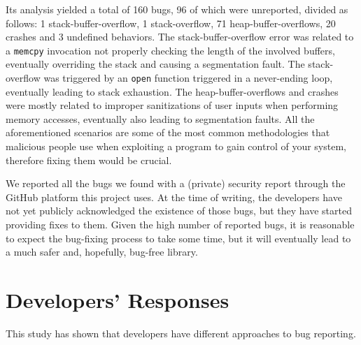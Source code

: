 Its analysis yielded a total of 160 bugs, 96 of which were unreported, divided as follows: 1 stack-buffer-overflow, 1 stack-overflow, 71 heap-buffer-overflows, 20 crashes and 3 undefined behaviors. The stack-buffer-overflow error was related to a \verb|memcpy| invocation not properly checking the length of the involved buffers, eventually overriding the stack and causing a segmentation fault. The stack-overflow was triggered by an \verb|open| function triggered in a never-ending loop, eventually leading to stack exhaustion. The heap-buffer-overflows and crashes were mostly related to improper sanitizations of user inputs when performing memory accesses, eventually also leading to segmentation faults. All the aforementioned scenarios are some of the most common methodologies that malicious people use when exploiting a program to gain control of your system, therefore fixing them would be crucial.

We reported all the bugs we found with a (private) security report through the GitHub platform this project uses. At the time of writing, the developers have not yet publicly acknowledged the existence of those bugs, but they have started providing fixes to them. Given the high number of reported bugs, it is reasonable to expect the bug-fixing process to take some time, but it will eventually lead to a much safer and, hopefully, bug-free library. 








\newpage
\section{Developers’ Responses}
This study has shown that developers have different approaches to bug reporting. 

